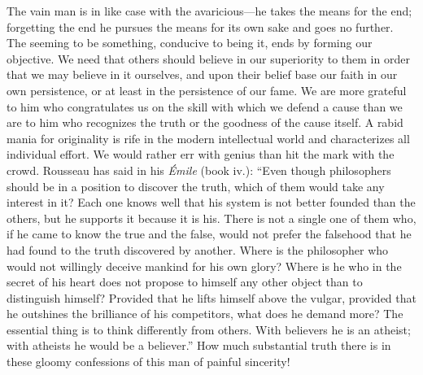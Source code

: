 The vain man is in like case with the av\-a\-ri\-cious---he takes the
means for the end; forgetting the end he pursues the means for its own
sake and goes no further. The seeming to be something, conducive to
being it, ends by forming our objective. We need that others should
believe in our superiority to them in order that we may believe in it
ourselves, and upon their belief base our faith in our own
persistence, or at least in the persistence of our fame. We are more
grateful to him who congratulates us on the skill with which we defend
a cause than we are to him who recognizes the truth or the goodness of
the cause itself. A rabid mania for originality is rife in the modern
intellectual world and characterizes all individual effort. We would
rather err with genius than hit the mark with the crowd. Rousseau has
said in his \textit{\'Emile} (book iv.): ``Even though philosophers
should be in a position to discover the truth, which of them would
take any interest in it? Each one knows well that his system is not
better founded than the others, but he supports it because it is his.
There is not a single one of them who, if he came to know the true and
the false, would not prefer the falsehood that he had found to the
truth discovered by another. Where is the philosopher who would not
willingly deceive mankind for his own glory? Where is he who in the
secret of his heart does not propose to himself any other object than
to distinguish himself? Provided that he lifts himself above the
vulgar, provided that he outshines the brilliance of his competitors,
what does he demand more? The essential thing is to think differently
from others. With believers he is an atheist; with atheists he would
be a believer.'' How much substantial truth there is in these gloomy
confessions of this man of painful sincerity!

